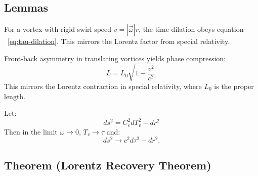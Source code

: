\documentclass[12pt]{article}
\begin{document}

    \subsection*{Lemmas}

    \begin{lemma}
        For a vortex with rigid swirl speed \( v = |\vec{\omega}| r \), the time dilation obeys equation ~\eqref{eq:tau-dilation}. This mirrors the Lorentz factor from special relativity.
    \end{lemma}

    \begin{lemma}
        Front-back asymmetry in translating vortices yields phase compression:
        \begin{equation}
            \boxed{
                L = L_0 \sqrt{1 - \frac{v^2}{c^2}}.
            }
            \label{eq:lorentz-length-contraction}
        \end{equation}
        This mirrors the Lorentz contraction in special relativity, where \( L_0 \) is the proper length.
    \end{lemma}

    \begin{lemma}
        Let:
        \begin{equation}
            \boxed{
                ds^2 = C_e^2 dT_v^2 - dr^2
            }
            \label{eq:swirl-metric}
        \end{equation}
        Then in the limit \( \omega \to 0 \), \( T_v \to \tau \) and:
        \[
            ds^2 \to c^2 d\tau^2 - dr^2.
        \]
    \end{lemma}


    \subsection*{Theorem (Lorentz Recovery Theorem)}
\end{document}
